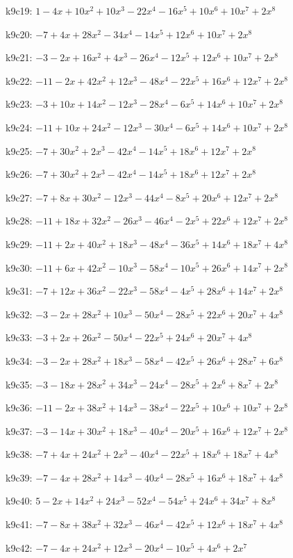 k9c19: $ 1-4x+10x^{2}+10x^{3}-22x^{4}-16x^{5}+10x^{6}+10x^{7}+2x^{8} $ 

k9c20: $ -7+4x+28x^{2}-34x^{4}-14x^{5}+12x^{6}+10x^{7}+2x^{8} $ 

k9c21: $ -3-2x+16x^{2}+4x^{3}-26x^{4}-12x^{5}+12x^{6}+10x^{7}+2x^{8} $ 

k9c22: $ -11-2x+42x^{2}+12x^{3}-48x^{4}-22x^{5}+16x^{6}+12x^{7}+2x^{8} $ 

k9c23: $ -3+10x+14x^{2}-12x^{3}-28x^{4}-6x^{5}+14x^{6}+10x^{7}+2x^{8} $ 

k9c24: $ -11+10x+24x^{2}-12x^{3}-30x^{4}-6x^{5}+14x^{6}+10x^{7}+2x^{8} $ 

k9c25: $ -7+30x^{2}+2x^{3}-42x^{4}-14x^{5}+18x^{6}+12x^{7}+2x^{8} $ 

k9c26: $ -7+30x^{2}+2x^{3}-42x^{4}-14x^{5}+18x^{6}+12x^{7}+2x^{8} $ 

k9c27: $ -7+8x+30x^{2}-12x^{3}-44x^{4}-8x^{5}+20x^{6}+12x^{7}+2x^{8} $ 

k9c28: $ -11+18x+32x^{2}-26x^{3}-46x^{4}-2x^{5}+22x^{6}+12x^{7}+2x^{8} $ 

k9c29: $ -11+2x+40x^{2}+18x^{3}-48x^{4}-36x^{5}+14x^{6}+18x^{7}+4x^{8} $ 

k9c30: $ -11+6x+42x^{2}-10x^{3}-58x^{4}-10x^{5}+26x^{6}+14x^{7}+2x^{8} $ 

k9c31: $ -7+12x+36x^{2}-22x^{3}-58x^{4}-4x^{5}+28x^{6}+14x^{7}+2x^{8} $ 

k9c32: $ -3-2x+28x^{2}+10x^{3}-50x^{4}-28x^{5}+22x^{6}+20x^{7}+4x^{8} $ 

k9c33: $ -3+2x+26x^{2}-50x^{4}-22x^{5}+24x^{6}+20x^{7}+4x^{8} $ 

k9c34: $ -3-2x+28x^{2}+18x^{3}-58x^{4}-42x^{5}+26x^{6}+28x^{7}+6x^{8} $ 

k9c35: $ -3-18x+28x^{2}+34x^{3}-24x^{4}-28x^{5}+2x^{6}+8x^{7}+2x^{8} $ 

k9c36: $ -11-2x+38x^{2}+14x^{3}-38x^{4}-22x^{5}+10x^{6}+10x^{7}+2x^{8} $ 

k9c37: $ -3-14x+30x^{2}+18x^{3}-40x^{4}-20x^{5}+16x^{6}+12x^{7}+2x^{8} $ 

k9c38: $ -7+4x+24x^{2}+2x^{3}-40x^{4}-22x^{5}+18x^{6}+18x^{7}+4x^{8} $ 

k9c39: $ -7-4x+28x^{2}+14x^{3}-40x^{4}-28x^{5}+16x^{6}+18x^{7}+4x^{8} $ 

k9c40: $ 5-2x+14x^{2}+24x^{3}-52x^{4}-54x^{5}+24x^{6}+34x^{7}+8x^{8} $ 

k9c41: $ -7-8x+38x^{2}+32x^{3}-46x^{4}-42x^{5}+12x^{6}+18x^{7}+4x^{8} $ 

k9c42: $ -7-4x+24x^{2}+12x^{3}-20x^{4}-10x^{5}+4x^{6}+2x^{7} $ 

